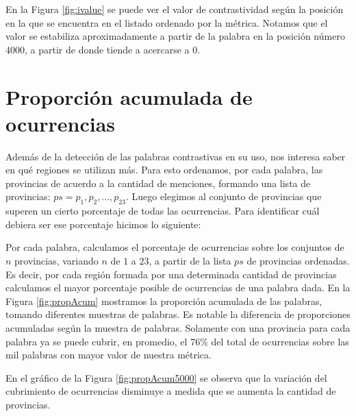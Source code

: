 En la Figura \ref{fig:ivalue} se puede ver el valor de contrastividad según la posición en la que se encuentra en el listado ordenado por la métrica. Notamos que el valor se estabiliza aproximadamente a partir de la palabra en la posición número 4000, a partir de donde tiende a acercarse a 0.





\section{Proporción acumulada de ocurrencias} %
\label{proporcionDeOcurrencias}
Además de la detección de las palabras contrastivas en su uso, nos interesa saber en qué regiones se utilizan más. Para esto ordenamos, por cada palabra, las provincias de acuerdo a la cantidad de menciones, formando una lista de provincias: $ps = p_1,p_2,...,p_{23}$. Luego elegimos al conjunto de provincias que superen un cierto porcentaje de todas las ocurrencias. Para identificar cuál debiera ser ese porcentaje hicimos lo siguiente:

Por cada palabra, calculamos el porcentaje de ocurrencias sobre los conjuntos de $n$ provincias, variando $n$ de $1$ a $23$, a partir de la lista $ps$ de provincias ordenadas. Es decir, por cada región formada por una determinada cantidad de provincias calculamos el mayor porcentaje posible de ocurrencias de una palabra dada.
En la Figura \ref{fig:propAcum} mostramos la proporción acumulada de las palabras, tomando diferentes muestras de palabras. Es notable la diferencia de proporciones acumuladas según la muestra de palabras. Solamente con una provincia para cada palabra ya se puede cubrir, en promedio, el 76\% del total de ocurrencias sobre las mil palabras con mayor valor de nuestra métrica.

En el gráfico de la Figura \ref{fig:propAcum5000} se observa que la variación del cubrimiento de ocurrencias disminuye a medida que se aumenta la cantidad de provincias. 




